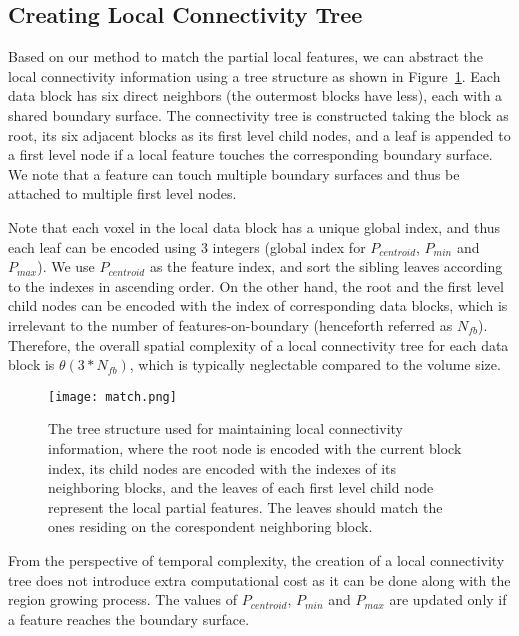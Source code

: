 \subsection{Creating Local Connectivity Tree}

Based on our method to match the partial local features, we can abstract the local connectivity information using a tree structure as shown in Figure~\ref{fig:match}. Each data block has six direct neighbors (the outermost blocks have less), each with a shared boundary surface. The connectivity tree is constructed taking the block as root, its six adjacent blocks as its first level child nodes, and a leaf is appended to a first level node if a local feature touches the corresponding boundary surface. We note that a feature can touch multiple boundary surfaces and thus be attached to multiple first level nodes.

Note that each voxel in the local data block has a unique global index, and thus each leaf can be encoded using 3 integers (global index for $P_{centroid}$, $P_{min}$ and $P_{max}$). We use $P_{centroid}$ as the feature index, and sort the sibling leaves according to the indexes in ascending order. On the other hand, the root and the first level child nodes can be encoded with the index of corresponding data blocks, which is irrelevant to the number of features-on-boundary (henceforth referred as $N_{fb}$). Therefore, the overall spatial complexity of a local connectivity tree for each data block is $\theta(3*N_{fb})$, which is typically neglectable compared to the volume size. 

\begin{figure}[t]
	\centering
	\texttt{[image: match.png]}
	\caption{The tree structure used for maintaining local connectivity information, where the root node is encoded with the current block index, its child nodes are encoded with the indexes of its neighboring blocks, and the leaves of each first level child node represent the local partial features. The leaves should match the ones residing on the corespondent neighboring block.}
	\label{fig:match}
\end{figure}

From the perspective of temporal complexity, the creation of a local connectivity tree does not introduce extra computational cost as it can be done along with the region growing process. The values of $P_{centroid}$, $P_{min}$ and $P_{max}$ are updated only if a feature reaches the boundary surface.

